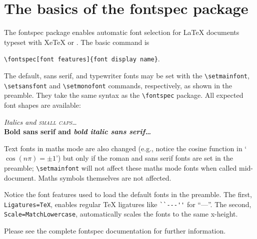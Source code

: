 \documentclass{article}
\begin{document}
\pagestyle{empty}

\section*{The basics of the \textsf{fontspec} package}

The \textsf{fontspec} package enables automatic font selection
for \LaTeX{} documents typeset with Xe\TeX{} or \LuaTeX.
The basic command is

{\centering \verb|\fontspec[font features]{font display name}|.\par}

The default, sans serif, and typewriter fonts may be set with the
\verb|\setmainfont|, \verb|\setsansfont| and \verb|\setmonofont|
commands, respectively, as shown in the preamble. They take the
same syntax as the \verb|\fontspec| package. All expected font
shapes are available:

\begin{center}
  {\itshape Italics and \scshape small caps\dots}\\
  {\sffamily\bfseries Bold sans serif and \itshape bold italic sans serif\dots}
\end{center}

Text fonts in maths mode are also changed (e.g., notice the cosine function in
`$\cos(n\pi)=\pm 1$') but only if the roman and sans serif fonts are set in
the preamble; \verb|\setmainfont| will not affect these maths mode fonts when
called mid-document.
Maths symbols themselves are not affected.

Notice the font features used to load the default fonts in the preamble.
The first, \verb|Ligatures=TeX|, enables regular \TeX{} ligatures like
\verb|``---''| for ``---''.
The second, \verb|Scale=MatchLowercase|, automatically scales the fonts to
the same x-height.

Please see the complete \textsf{fontspec} documentation for further
information.
\end{document}
